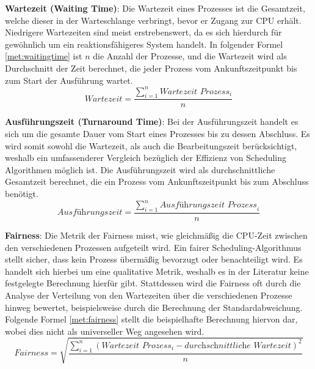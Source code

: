 \textbf{Wartezeit (Waiting Time)}: Die Wartezeit eines Prozesses ist die Gesamtzeit, welche dieser in der Warteschlange verbringt, bevor er Zugang zur \ac{CPU} erhält. Niedrigere Wartezeiten sind meist erstrebenswert, da es sich hierdurch für gewöhnlich um ein reaktionsfähigeres System handelt. In folgender Formel \ref{met:waitingtime} ist \( n \) die Anzahl der Prozesse, und die Wartezeit wird als Durchschnitt der Zeit berechnet, die jeder Prozess vom Ankunftszeitpunkt bis zum Start der Ausführung wartet.
\begin{equation}
\textit{Wartezeit} = \frac{\sum_{i=1}^{n} \textit{Wartezeit Prozess}_{i}}{n}
\label{met:waitingtime}
\end{equation}


\textbf{Ausführungszeit (Turnaround Time)}: Bei der Ausführungszeit handelt es sich um die gesamte Dauer vom Start eines Prozesses bis zu dessen Abschluss. Es wird somit sowohl die Wartezeit, als auch die Bearbeitungszeit berücksichtigt, weshalb ein umfassenderer Vergleich bezüglich der Effizienz von Scheduling Algorithmen möglich ist. Die Ausführungszeit wird als durchschnittliche Gesamtzeit berechnet, die ein Prozess vom Ankunftszeitpunkt bis zum Abschluss benötigt.
\begin{equation}
	\textit{Ausführungszeit} = \frac{\sum_{i=1}^{n} \textit{Ausführungszeit Prozess}_{i}}{n}
	\label{met:turnaroundtime}
\end{equation}


\textbf{Fairness}: Die Metrik der Fairness misst, wie gleichmäßig die \ac{CPU}-Zeit zwischen den verschiedenen Prozessen aufgeteilt wird. Ein fairer Scheduling-Algorithmus stellt sicher, dass kein Prozess übermäßig bevorzugt oder benachteiligt wird. Es handelt sich hierbei um eine qualitative Metrik, weshalb es in der Literatur keine festgelegte Berechnung hierfür gibt. Stattdessen wird die Fairness oft durch die Analyse der Verteilung von den Wartezeiten über die verschiedenen Prozesse hinweg bewertet, beispielsweise durch die Berechnung der Standardabweichung. Folgende Formel \ref{met:fairness} stellt die beispielhafte Berechnung hiervon dar, wobei dies nicht als universeller Weg angesehen wird. 
\begin{equation}
	\textit{Fairness} = \sqrt{\frac{\sum_{i=1}^{n} (\textit{Wartezeit Prozess}_{i} - \textit{durchschnittliche Wartezeit})^2}{n}}
	\label{met:fairness}
\end{equation}
